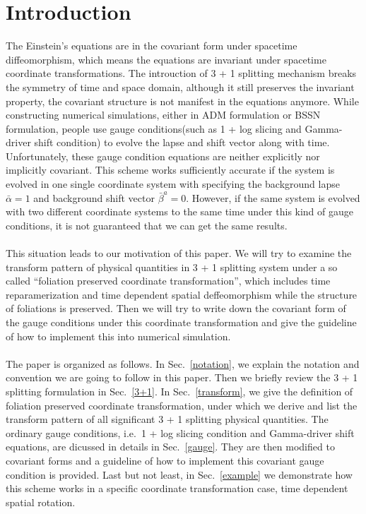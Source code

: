 \documentclass[letterpaper,nofootinbib,prd,amsmath,onecolumn]{revtex4-1}
\begin{document}
\section{Introduction}
The Einstein's equations are in the covariant form under spacetime diffeomorphism, which means the equations are invariant under spacetime coordinate transformations. The introuction of 3 + 1 splitting mechanism breaks the symmetry of time and space domain, although it still preserves the invariant property, the covariant structure is not manifest in the equations anymore. While constructing numerical simulations, either in ADM formulation or BSSN formulation, people use gauge conditions(such as 1 + log slicing and Gamma-driver shift condition) to evolve the lapse and shift vector along with time. Unfortunately, these gauge condition equations are neither explicitly nor implicitly covariant. This scheme works sufficiently accurate if the system is evolved in one single coordinate system with specifying the background lapse ${\bar \alpha} = 1$ and background shift vector ${\bar \beta}^{a} = 0$. However, if the same system is evolved with two different coordinate systems to the same time under this kind of gauge conditions, it is not guaranteed that we can get the same results. \\
\\
This situation leads to our motivation of this paper. We will try to examine the transform pattern of physical quantities in 3 + 1 splitting system under a so called ``foliation preserved coordinate transformation'', which includes time reparamerization and time dependent spatial deffeomorphism while the structure of foliations is preserved. Then we will try to write down the covariant form of the gauge conditions under this coordinate transformation and give the guideline of how to implement this into numerical simulation. 
\\
\\
The paper is organized as follows. In Sec.~\ref{notation}, we explain the notation and convention we are going to follow in this paper. Then we briefly review the 3 + 1 splitting formulation in Sec.~\ref{3+1}. In Sec.~\ref{transform}, we give the definition of foliation preserved coordinate transformation, under which we derive and list the transform pattern of all significant 3 + 1 splitting physical quantities. The ordinary gauge conditions, i.e.~1 + log slicing condition and Gamma-driver shift equations, are dicussed in details in Sec.~\ref{gauge}. They are then modified to covariant forms and a guideline of how to implement this covariant gauge condition is provided. Last but not least, in Sec.~\ref{example} we demonstrate how this scheme works in a specific coordinate transformation case, time dependent spatial rotation.
\end{document}
